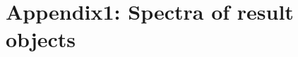 \graphicspath{{pic/results/}}
\chapter{Appendix1: Spectra of result objects}
\begin{figure}[!htbp]
  \centering
\end{figure}

\begin{figure}[!htbp]    
  \centering
\end{figure}

